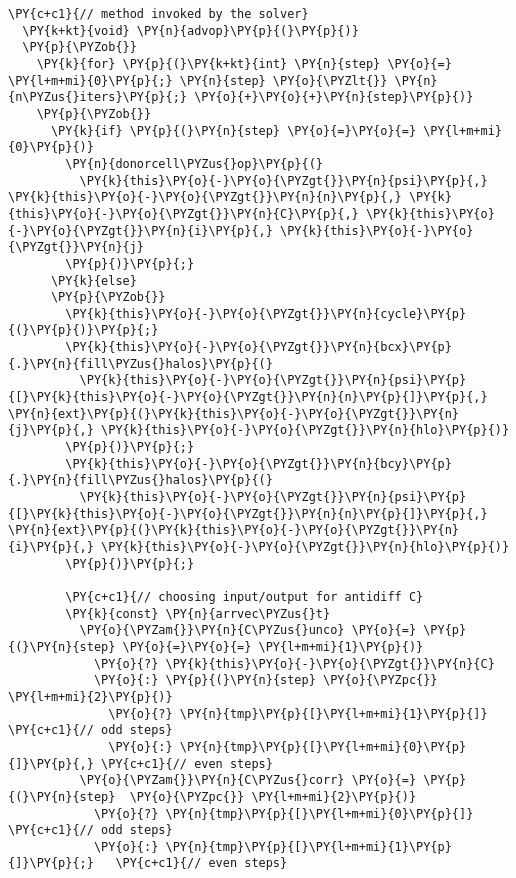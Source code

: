 \begin{Verbatim}[commandchars=\\\{\}]
  \PY{c+c1}{// method invoked by the solver}
  \PY{k+kt}{void} \PY{n}{advop}\PY{p}{(}\PY{p}{)}
  \PY{p}{\PYZob{}}
    \PY{k}{for} \PY{p}{(}\PY{k+kt}{int} \PY{n}{step} \PY{o}{=} \PY{l+m+mi}{0}\PY{p}{;} \PY{n}{step} \PY{o}{\PYZlt{}} \PY{n}{n\PYZus{}iters}\PY{p}{;} \PY{o}{+}\PY{o}{+}\PY{n}{step}\PY{p}{)} 
    \PY{p}{\PYZob{}}
      \PY{k}{if} \PY{p}{(}\PY{n}{step} \PY{o}{=}\PY{o}{=} \PY{l+m+mi}{0}\PY{p}{)} 
        \PY{n}{donorcell\PYZus{}op}\PY{p}{(}
          \PY{k}{this}\PY{o}{-}\PY{o}{\PYZgt{}}\PY{n}{psi}\PY{p}{,} \PY{k}{this}\PY{o}{-}\PY{o}{\PYZgt{}}\PY{n}{n}\PY{p}{,} \PY{k}{this}\PY{o}{-}\PY{o}{\PYZgt{}}\PY{n}{C}\PY{p}{,} \PY{k}{this}\PY{o}{-}\PY{o}{\PYZgt{}}\PY{n}{i}\PY{p}{,} \PY{k}{this}\PY{o}{-}\PY{o}{\PYZgt{}}\PY{n}{j}
        \PY{p}{)}\PY{p}{;}
      \PY{k}{else}
      \PY{p}{\PYZob{}}
        \PY{k}{this}\PY{o}{-}\PY{o}{\PYZgt{}}\PY{n}{cycle}\PY{p}{(}\PY{p}{)}\PY{p}{;}
        \PY{k}{this}\PY{o}{-}\PY{o}{\PYZgt{}}\PY{n}{bcx}\PY{p}{.}\PY{n}{fill\PYZus{}halos}\PY{p}{(}
          \PY{k}{this}\PY{o}{-}\PY{o}{\PYZgt{}}\PY{n}{psi}\PY{p}{[}\PY{k}{this}\PY{o}{-}\PY{o}{\PYZgt{}}\PY{n}{n}\PY{p}{]}\PY{p}{,} \PY{n}{ext}\PY{p}{(}\PY{k}{this}\PY{o}{-}\PY{o}{\PYZgt{}}\PY{n}{j}\PY{p}{,} \PY{k}{this}\PY{o}{-}\PY{o}{\PYZgt{}}\PY{n}{hlo}\PY{p}{)}
        \PY{p}{)}\PY{p}{;}
        \PY{k}{this}\PY{o}{-}\PY{o}{\PYZgt{}}\PY{n}{bcy}\PY{p}{.}\PY{n}{fill\PYZus{}halos}\PY{p}{(}
          \PY{k}{this}\PY{o}{-}\PY{o}{\PYZgt{}}\PY{n}{psi}\PY{p}{[}\PY{k}{this}\PY{o}{-}\PY{o}{\PYZgt{}}\PY{n}{n}\PY{p}{]}\PY{p}{,} \PY{n}{ext}\PY{p}{(}\PY{k}{this}\PY{o}{-}\PY{o}{\PYZgt{}}\PY{n}{i}\PY{p}{,} \PY{k}{this}\PY{o}{-}\PY{o}{\PYZgt{}}\PY{n}{hlo}\PY{p}{)}
        \PY{p}{)}\PY{p}{;}

        \PY{c+c1}{// choosing input/output for antidiff C}
        \PY{k}{const} \PY{n}{arrvec\PYZus{}t} 
          \PY{o}{\PYZam{}}\PY{n}{C\PYZus{}unco} \PY{o}{=} \PY{p}{(}\PY{n}{step} \PY{o}{=}\PY{o}{=} \PY{l+m+mi}{1}\PY{p}{)} 
            \PY{o}{?} \PY{k}{this}\PY{o}{-}\PY{o}{\PYZgt{}}\PY{n}{C} 
            \PY{o}{:} \PY{p}{(}\PY{n}{step} \PY{o}{\PYZpc{}} \PY{l+m+mi}{2}\PY{p}{)} 
              \PY{o}{?} \PY{n}{tmp}\PY{p}{[}\PY{l+m+mi}{1}\PY{p}{]}  \PY{c+c1}{// odd steps}
              \PY{o}{:} \PY{n}{tmp}\PY{p}{[}\PY{l+m+mi}{0}\PY{p}{]}\PY{p}{,} \PY{c+c1}{// even steps}
          \PY{o}{\PYZam{}}\PY{n}{C\PYZus{}corr} \PY{o}{=} \PY{p}{(}\PY{n}{step}  \PY{o}{\PYZpc{}} \PY{l+m+mi}{2}\PY{p}{)} 
            \PY{o}{?} \PY{n}{tmp}\PY{p}{[}\PY{l+m+mi}{0}\PY{p}{]}    \PY{c+c1}{// odd steps}
            \PY{o}{:} \PY{n}{tmp}\PY{p}{[}\PY{l+m+mi}{1}\PY{p}{]}\PY{p}{;}   \PY{c+c1}{// even steps}


\end{Verbatim}
